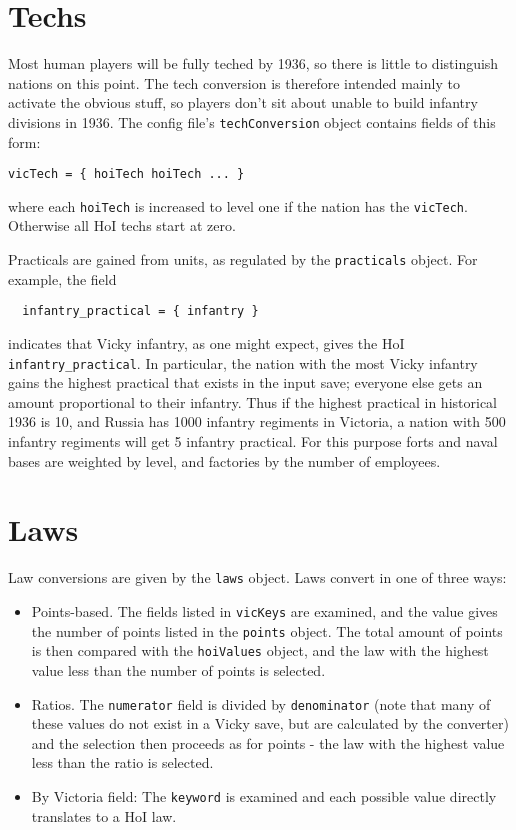 \documentclass[12pt,ebook,oneside]{book}
\begin{document}
\section{Techs}

Most human players will be fully teched by 1936, so there is little to
distinguish nations on this point. The tech conversion is therefore
intended mainly to activate the obvious stuff, so players don't sit
about unable to build infantry divisions in 1936. The config file's
\texttt{techConversion} object contains fields of this form:
\begin{verbatim}
vicTech = { hoiTech hoiTech ... }
\end{verbatim}
where each \texttt{hoiTech} is increased to level one if the nation
has the \texttt{vicTech}. Otherwise all HoI techs start at zero. 

Practicals are gained from units, as regulated by the
\texttt{practicals} object. For example, the field
\begin{verbatim}
  infantry_practical = { infantry }
\end{verbatim}
indicates that Vicky infantry, as one might expect, gives the HoI
\texttt{infantry\_practical}. In particular, the nation with the most
Vicky infantry gains the highest practical that exists in the input
save; everyone else gets an amount proportional to their
infantry. Thus if the highest practical in historical 1936 is 10, and
Russia has 1000 infantry regiments in Victoria, a nation with 500
infantry regiments will get 5 infantry practical. For this purpose
forts and naval bases are weighted by level, and factories by the
number of employees. 

\section{Laws}

Law conversions are given by the \texttt{laws} object.
Laws convert in one of three ways:
\begin{itemize}
\item Points-based. The fields listed in \texttt{vicKeys} are
  examined, and the value gives the number of points listed in the
  \texttt{points} object. The total amount of points is then compared
  with the \texttt{hoiValues} object, and the law with the highest
  value less than the number of points is selected. 
\item Ratios. The \texttt{numerator} field is divided by
  \texttt{denominator} (note that many of these values do not exist in
  a Vicky save, but are calculated by the converter) and the selection
  then proceeds as for points - the law with the highest value less
  than the ratio is selected. 
\item By Victoria field: The \texttt{keyword} is examined and each
  possible value directly translates to a HoI law. 
\end{itemize}
\end{document}
